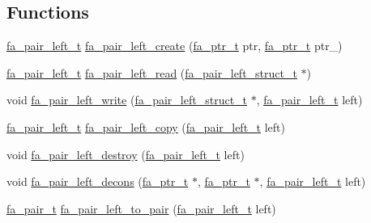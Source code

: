 \subsection*{Functions}
\begin{DoxyCompactItemize}
\item 
\hyperlink{group___fa_pair_left_ga3d01023403cd976e31ce70c510fcf2be}{fa\-\_\-pair\-\_\-left\-\_\-t} \hyperlink{group___fa_pair_left_gab071a01e7d5974198a82ca3ae4d65ca6}{fa\-\_\-pair\-\_\-left\-\_\-create} (\hyperlink{group___fa_ga915ddeae99ad7568b273d2b876425197}{fa\-\_\-ptr\-\_\-t} ptr, \hyperlink{group___fa_ga915ddeae99ad7568b273d2b876425197}{fa\-\_\-ptr\-\_\-t} ptr\-\_\-)
\item 
\hyperlink{group___fa_pair_left_ga3d01023403cd976e31ce70c510fcf2be}{fa\-\_\-pair\-\_\-left\-\_\-t} \hyperlink{group___fa_pair_left_gaa30dbf467bdbc3f591e0c4f0dd76986e}{fa\-\_\-pair\-\_\-left\-\_\-read} (\hyperlink{structfa__pair__left__struct__t}{fa\-\_\-pair\-\_\-left\-\_\-struct\-\_\-t} $\ast$)
\item 
void \hyperlink{group___fa_pair_left_gacb4513e47c0bbeeab5a8fcb8315f7e24}{fa\-\_\-pair\-\_\-left\-\_\-write} (\hyperlink{structfa__pair__left__struct__t}{fa\-\_\-pair\-\_\-left\-\_\-struct\-\_\-t} $\ast$, \hyperlink{group___fa_pair_left_ga3d01023403cd976e31ce70c510fcf2be}{fa\-\_\-pair\-\_\-left\-\_\-t} left)
\item 
\hyperlink{group___fa_pair_left_ga3d01023403cd976e31ce70c510fcf2be}{fa\-\_\-pair\-\_\-left\-\_\-t} \hyperlink{group___fa_pair_left_gad87b9e144df45df51af0e010b6751c13}{fa\-\_\-pair\-\_\-left\-\_\-copy} (\hyperlink{group___fa_pair_left_ga3d01023403cd976e31ce70c510fcf2be}{fa\-\_\-pair\-\_\-left\-\_\-t} left)
\item 
void \hyperlink{group___fa_pair_left_ga6438d6d5d834e55e81e84b3a9e920096}{fa\-\_\-pair\-\_\-left\-\_\-destroy} (\hyperlink{group___fa_pair_left_ga3d01023403cd976e31ce70c510fcf2be}{fa\-\_\-pair\-\_\-left\-\_\-t} left)
\item 
void \hyperlink{group___fa_pair_left_gafc68b183f1d555b865478015e0b1c867}{fa\-\_\-pair\-\_\-left\-\_\-decons} (\hyperlink{group___fa_ga915ddeae99ad7568b273d2b876425197}{fa\-\_\-ptr\-\_\-t} $\ast$, \hyperlink{group___fa_ga915ddeae99ad7568b273d2b876425197}{fa\-\_\-ptr\-\_\-t} $\ast$, \hyperlink{group___fa_pair_left_ga3d01023403cd976e31ce70c510fcf2be}{fa\-\_\-pair\-\_\-left\-\_\-t} left)
\item 
\hyperlink{group___fa_pair_gac2b2e58c230bac4f8a63ef6c05072680}{fa\-\_\-pair\-\_\-t} \hyperlink{group___fa_pair_left_gaded07faa969a9291e3e00fe7192c190e}{fa\-\_\-pair\-\_\-left\-\_\-to\-\_\-pair} (\hyperlink{group___fa_pair_left_ga3d01023403cd976e31ce70c510fcf2be}{fa\-\_\-pair\-\_\-left\-\_\-t} left)

\end{DoxyCompactItemize}

